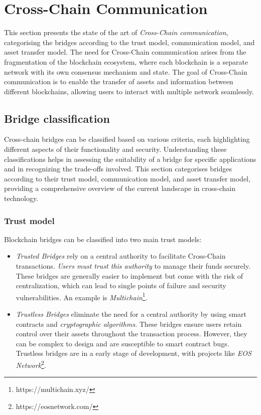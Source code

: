 \section{Cross-Chain Communication}
\label{sec:cross_chain_communication}

This section presents the state of the art of \textit{Cross-Chain communication}, categorising the bridges according to the trust model, communication model, and asset transfer model. The need for Cross-Chain communication arises from the fragmentation of the blockchain ecosystem, where each blockchain is a separate network with its own consensus mechanism and state. The goal of Cross-Chain communication is to enable the transfer of assets and information between different blockchains, allowing users to interact with multiple network seamlessly. 

\subsection{Bridge classification}
\label{subsec:bridge_classification}

Cross-chain bridges can be classified based on various criteria, each highlighting different aspects of their functionality and security. Understanding these classifications helps in assessing the suitability of a bridge for specific applications and in recognizing the trade-offs involved. This section categorises bridges according to their trust model, communication model, and asset transfer model, providing a comprehensive overview of the current landscape in cross-chain technology. \cite{lifi-bridge}

\subsubsection{Trust model}
\label{subsubsec:trust_model}

Blockchain bridges can be classified into two main trust models: 
\begin{itemize}
    \item \textit{Trusted Bridges} rely on a central authority to facilitate Cross-Chain transactions. \textit{Users must trust this authority} to manage their funds securely. These bridges are generally easier to implement but come with the risk of centralization, which can lead to single points of failure and security vulnerabilities. \cite{immunebytes-trust-bridge} An example is \textit{Multichain}\footnote{https://multichain.xyz/}.
    \item \textit{Trustless Bridges} eliminate the need for a central authority by using smart contracts and \textit{cryptographic algorithms}. These bridges ensure users retain control over their assets throughout the transaction process. However, they can be complex to design and are susceptible to smart contract bugs. \cite{immunebytes-trust-bridge} Trustless bridges are in a early stage of development, with projects like \textit{EOS Network}\footnote{https://eosnetwork.com/}.
\end{itemize}

